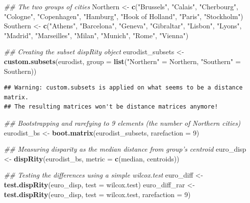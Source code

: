 \documentclass[]{book}
\newenvironment{Shaded}{\begin{snugshade}}{\end{snugshade}}
\newcommand{\CommentTok}[1]{\textcolor[rgb]{0.56,0.35,0.01}{\textit{#1}}}
\newcommand{\DataTypeTok}[1]{\textcolor[rgb]{0.13,0.29,0.53}{#1}}
\newcommand{\DecValTok}[1]{\textcolor[rgb]{0.00,0.00,0.81}{#1}}
\newcommand{\KeywordTok}[1]{\textcolor[rgb]{0.13,0.29,0.53}{\textbf{#1}}}
\newcommand{\NormalTok}[1]{#1}
\newcommand{\StringTok}[1]{\textcolor[rgb]{0.31,0.60,0.02}{#1}}
\begin{document}
\begin{Shaded}
\begin{Highlighting}[]
\CommentTok{## The two groups of cities}
\NormalTok{Northern <-}\StringTok{ }\KeywordTok{c}\NormalTok{(}\StringTok{"Brussels"}\NormalTok{, }\StringTok{"Calais"}\NormalTok{, }\StringTok{"Cherbourg"}\NormalTok{, }\StringTok{"Cologne"}\NormalTok{, }\StringTok{"Copenhagen"}\NormalTok{,}
              \StringTok{"Hamburg"}\NormalTok{, }\StringTok{"Hook of Holland"}\NormalTok{, }\StringTok{"Paris"}\NormalTok{, }\StringTok{"Stockholm"}\NormalTok{)}
\NormalTok{Southern <-}\StringTok{ }\KeywordTok{c}\NormalTok{(}\StringTok{"Athens"}\NormalTok{, }\StringTok{"Barcelona"}\NormalTok{, }\StringTok{"Geneva"}\NormalTok{, }\StringTok{"Gibraltar"}\NormalTok{, }\StringTok{"Lisbon"}\NormalTok{, }\StringTok{"Lyons"}\NormalTok{,}
              \StringTok{"Madrid"}\NormalTok{, }\StringTok{"Marseilles"}\NormalTok{, }\StringTok{"Milan"}\NormalTok{, }\StringTok{"Munich"}\NormalTok{, }\StringTok{"Rome"}\NormalTok{, }\StringTok{"Vienna"}\NormalTok{)}

\CommentTok{## Creating the subset dispRity object}
\NormalTok{eurodist_subsets <-}\StringTok{ }\KeywordTok{custom.subsets}\NormalTok{(eurodist, }\DataTypeTok{group =} \KeywordTok{list}\NormalTok{(}\StringTok{"Northern"}\NormalTok{ =}\StringTok{ }\NormalTok{Northern,}
                                                        \StringTok{"Southern"}\NormalTok{ =}\StringTok{ }\NormalTok{Southern))}
\end{Highlighting}
\end{Shaded}

\begin{verbatim}
## Warning: custom.subsets is applied on what seems to be a distance matrix.
## The resulting matrices won't be distance matrices anymore!
\end{verbatim}

\begin{Shaded}
\begin{Highlighting}[]
\CommentTok{## Bootstrapping and rarefying to 9 elements (the number of Northern cities)}
\NormalTok{eurodist_bs <-}\StringTok{ }\KeywordTok{boot.matrix}\NormalTok{(eurodist_subsets, }\DataTypeTok{rarefaction =} \DecValTok{9}\NormalTok{)}

\CommentTok{## Measuring disparity as the median distance from group's centroid}
\NormalTok{euro_disp <-}\StringTok{ }\KeywordTok{dispRity}\NormalTok{(eurodist_bs, }\DataTypeTok{metric =} \KeywordTok{c}\NormalTok{(median, centroids))}

\CommentTok{## Testing the differences using a simple wilcox.test}
\NormalTok{euro_diff <-}\StringTok{ }\KeywordTok{test.dispRity}\NormalTok{(euro_disp, }\DataTypeTok{test =}\NormalTok{ wilcox.test)}
\NormalTok{euro_diff_rar <-}\StringTok{ }\KeywordTok{test.dispRity}\NormalTok{(euro_disp, }\DataTypeTok{test =}\NormalTok{ wilcox.test, }\DataTypeTok{rarefaction =} \DecValTok{9}\NormalTok{)}
\end{Highlighting}
\end{Shaded}
\end{document}
